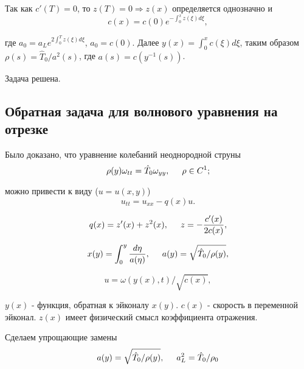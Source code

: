 \documentclass{article}
\begin{document}
Так как $c'(T) = 0$, то $z(T) = 0 \Rightarrow z(x)$ определяется однозначно и 
\begin{equation*}
c(x) = c(0) e^{-\int_0^x z(\xi) d\xi},
\end{equation*}

где $a_0 = a_L e^{2\int_0^T z(\xi) d\xi}$, $a_0 = c(0)$.
Далее $y(x) = \int_0^x c(\xi) d\xi$, таким образом $\rho(s) = \hat{T}_0 / a^2(s)$, где $a(s) = c(y^{-1}(s))$.

Задача решена.



\subsection*{Обратная задача для волнового уравнения на отрезке}

Было доказано, что уравнение колебаний неоднородной струны
\begin{equation}
\rho(y) \omega_{tt} = \hat{T}_0 \omega_{yy}, \hspace{0.5cm} \rho \in C^1;
\end{equation}

можно привести к виду ($u = u(x,y)$)
\begin{equation}
u_{tt} = u_{xx} - q(x) u.
\label{oscillation eq}
\end{equation}

\begin{equation*}
q(x) = z'(x) + z^2(x), \hspace{0.5cm} z = -\dfrac{c'(x)}{2 c(x)},
\end{equation*}

\begin{equation*}
x(y) = \int_0^y \dfrac{d \eta}{a(\eta)}, \hspace{0.5cm} a(y) = \sqrt{\hat{T}_0/ \rho(y)},
\end{equation*}

\begin{equation}
u = \omega(y(x),t)/ \sqrt{c(x)}, 
\end{equation}

$y(x)$ - функция, обратная к эйконалу $x(y)$. $c(x)$ - скорость в переменной эйконал. $z(x)$ имеет физический смысл коэффициента отражения.

Сделаем упрощающие замены
\begin{equation*}
a(y) = \sqrt{\hat{T}_0/ \rho(y)}, \hspace{0.5cm} a_L^2 = \hat{T}_0 / \rho_0
\end{equation*}
\end{document}
